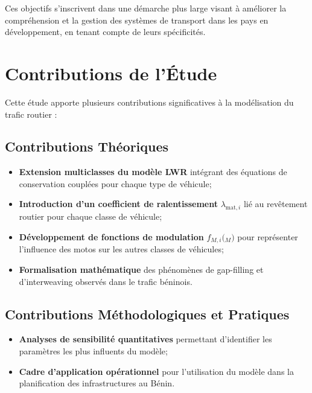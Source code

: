 Ces objectifs s'inscrivent dans une démarche plus large visant à améliorer la compréhension et la gestion des systèmes de transport dans les pays en développement, en tenant compte de leurs spécificités.

\section{Contributions de l'Étude}
\label{sec:contributions}

Cette étude apporte plusieurs contributions significatives à la modélisation du trafic routier :

\subsection{Contributions Théoriques}
\label{subsec:contrib_theoriques}

\begin{itemize}
\item \textbf{Extension multiclasses du modèle LWR} intégrant des équations de conservation couplées pour chaque type de véhicule;
\item \textbf{Introduction d'un coefficient de ralentissement} $\lambda_{\text{mat},i}$ lié au revêtement routier pour chaque classe de véhicule;
\item \textbf{Développement de fonctions de modulation} $f_{M,i}($\rho$_M)$ pour représenter l'influence des motos sur les autres classes de véhicules;
\item \textbf{Formalisation mathématique} des phénomènes de gap-filling et d'interweaving observés dans le trafic béninois.
\end{itemize}

\subsection{Contributions Méthodologiques et Pratiques}
\label{subsec:contrib_pratiques}

\begin{itemize}
\item \textbf{Analyses de sensibilité quantitatives} permettant d'identifier les paramètres les plus influents du modèle;
\item \textbf{Cadre d'application opérationnel} pour l'utilisation du modèle dans la planification des infrastructures au Bénin.
\end{itemize}

